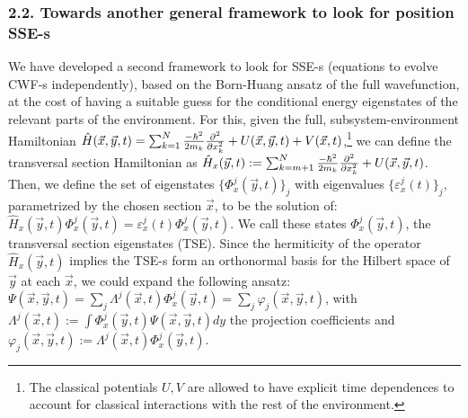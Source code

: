 \documentclass[11pt, a4paper]{article} %
\begin{document}
\subsubsection*{2.2. Towards another general framework to look for position SSE-s}
We have developed a second framework to look for SSE-s (equations to evolve CWF-s independently), based on the Born-Huang ansatz of the full wavefunction, at the cost of having a suitable guess for the conditional energy eigenstates of the relevant parts of the environment. For this, given the full, subsystem-environment Hamiltonian $\hat{H}(\vec{x},\vec{y},t)=\sum_{k=1}^N \frac{-\hbar^2}{2m_k}\pdv[2]{}{x_k} + U(\vec{x},\vec{y},t)+V(\vec{x},t)$,\footnote{The classical potentials $U,V$ are allowed to have explicit time dependences to account for classical interactions with the rest of the environment.} we can define the transversal section Hamiltonian as $\hat{H}_x(\vec{y},t):=\sum_{k=m+1}^N\frac{-\hbar^2}{2m_k}\pdv[2]{}{x_k}+U(\vec{x},\vec{y},t)$. Then, we define the set of eigenstates $\{\Phi^j_x(\vec{y},t)\}_j$ with eigenvalues $\{\varepsilon_x^j(t)\}_j$, parametrized by the chosen section $\vec{x}$, to be the solution of: $\hat{H}_x(\vec{y},t)\Phi^j_x(\vec{y},t)=\varepsilon_x^j(t)\Phi^j_x(\vec{y},t)$. We call these states $\Phi^j_x(\vec{y},t)$, the transversal section eigenstates (TSE). Since the hermiticity of the operator $\hat{H}_x(\vec{y},t)$ implies the TSE-s form an orthonormal basis for the Hilbert space of $\vec{y}$ at each $\vec{x}$, we could expand the following ansatz: $\Psi(\vec{x},\vec{y},t)=\sum_j \Lambda^j(\vec{x},t)\Phi_x^j(\vec{y},t)=\sum_j \varphi_j(\vec{x},\vec{y},t)$, with $\Lambda^j(\vec{x},t):=\int\Phi^j_x(\vec{y},t)\Psi(\vec{x},\vec{y},t)dy$ the projection coefficients and $\varphi_j(\vec{x},\vec{y},t):=\Lambda^j(\vec{x},t)\Phi^j_x(\vec{y},t)$.
\end{document}
